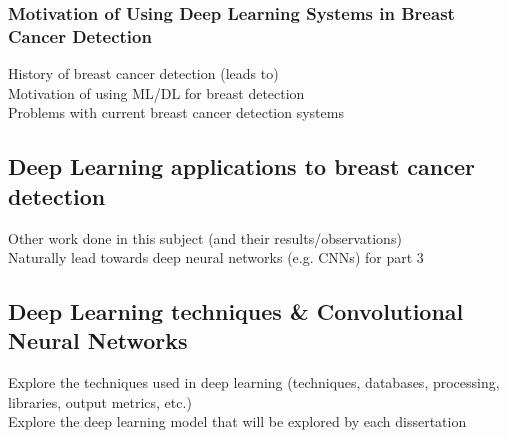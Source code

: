 \documentclass[letterpaper,12pt]{article}
\begin{document}
\subsubsection{Motivation of Using Deep Learning Systems in Breast Cancer Detection}

History of breast cancer detection (leads to)\\
Motivation of using ML/DL for breast detection\\
Problems with current breast cancer detection systems

\subsection{Deep Learning applications to breast cancer detection}
Other work done in this subject (and their results/observations)\\
Naturally lead towards deep neural networks (e.g. CNNs) for part 3

\subsection{Deep Learning techniques \& Convolutional Neural Networks}
Explore the techniques used in deep learning (techniques, databases, processing, libraries, output metrics, etc.)\\
Explore the deep learning model that will be explored by each dissertation


\begin{appendices}

\clearpage



\end{appendices}
\end{document}
